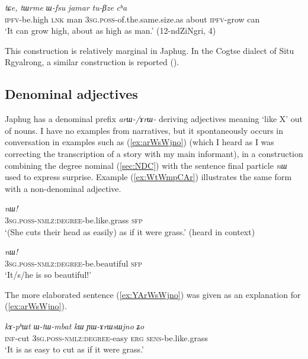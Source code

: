 \documentclass[oneside,a4paper,12pt]{article}
\newcommand{\ipa}[1]{{\phon\textit{#1}}}
\begin{document}
\begin{exe}
\ex \label{ex:Wfsu}
\gll \ipa{tu-mbro} 	\ipa{tɕe,} 	\ipa{tɯrme} 	\ipa{ɯ-fsu} 	\ipa{jamar} 	\ipa{tu-βze} 	\ipa{cʰa} \\
\textsc{ipfv}-be.high \textsc{lnk} man \textsc{3sg.poss}-of.the.same.size.as about \textsc{ipfv}-grow can \\
\glt `It can grow high, about as high as man.' (12-ndZiNgri, 4)
\end{exe}

This construction is relatively marginal in Japhug. In the Cogtse dialect of Situ Rgyalrong, a similar construction is reported (\citealt[377]{linxr93jiarong}).

\subsection{Denominal adjectives} \label{sec:denominal}
Japhug has a denominal prefix \ipa{arɯ-/ɤrɯ-} deriving adjectives meaning `like X' out of nouns. I have no examples from narratives, but it spontaneously occurs in conversation  in examples such as (\ref{ex:arWsWjno}) (which I heard as I was correcting the transcription of a story with my main informant), in a construction combining the degree nominal (\ref{sec:NDC}) with the sentence final particle \ipa{nɯ} used to express surprise. Example (\ref{ex:WtWmpCAr}) illustrates the same form with a non-denominal adjective.

\begin{exe}
\ex \label{ex:arWsWjno}
\gll \ipa{ɯ-tɯ-ɤrɯsɯjno} 	\ipa{nɯ!}  \\
\textsc{3sg.poss-nmlz:degree}-be.like.grass \textsc{sfp} \\
\glt `(She cuts their head as easily) as if it were grass.' (heard in context)
\end{exe}

\begin{exe}
\ex \label{ex:WtWmpCAr}
\gll \ipa{ɯ-tɯ-mpɕɤr} 	\ipa{nɯ!}  \\
\textsc{3sg.poss-nmlz:degree}-be.beautiful \textsc{sfp} \\
\glt `It/s/he is so beautiful!'
\end{exe}

The more elaborated sentence (\ref{ex:YArWsWjno}) was given as an explanation for (\ref{ex:arWsWjno}).

\begin{exe}
\ex \label{ex:YArWsWjno}
\gll  
\ipa{kɤ-pʰɯt} 	\ipa{ɯ-tɯ-mbat} 	\ipa{kɯ} 	\ipa{ɲɯ-ɤrɯsɯjno} 	\ipa{ʑo} \\
\textsc{inf}-cut  \textsc{3sg.poss-nmlz:degree}-easy \textsc{erg} \textsc{sens}-be.like.grass \\
\glt `It is as easy to cut as if it were grass.' 
\end{exe}
\end{document}
